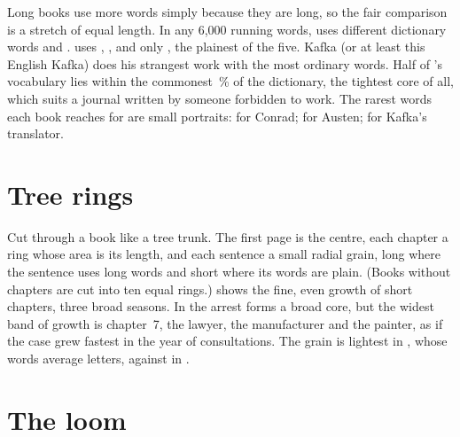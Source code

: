 Long books use more words simply because they are long, so the fair comparison
is a stretch of equal length. In any 6,000 running words, 
uses  different dictionary words and
 .  uses
, 
, and  only
, the plainest of the five. Kafka (or at least this
English Kafka) does his strangest work with the most ordinary words. Half of
's vocabulary lies within the commonest
\,\% of the dictionary, the tightest core of
all, which suits a journal written by someone forbidden to work. The rarest words
each book reaches for are small portraits: 
for Conrad;  for Austen;
 for Kafka's translator.

\clearpage
\section{Tree rings}

\begin{center}
\end{center}

\noindent Cut through a book like a tree trunk. The first page is the centre,
each chapter a ring whose area is its length, and each sentence a small radial
grain, long where the sentence uses long words and short where its words are
plain. (Books without chapters are cut into ten equal rings.) 
shows the fine, even growth of  short chapters,
 three broad seasons. In  the arrest
forms a broad core, but the widest band of growth is chapter~7, the lawyer,
the manufacturer and the painter, as if the case grew fastest in the year of
consultations. The grain is lightest in , whose words
average  letters, against
 in .

\clearpage
\section{The loom}

\begin{center}
\end{center}

